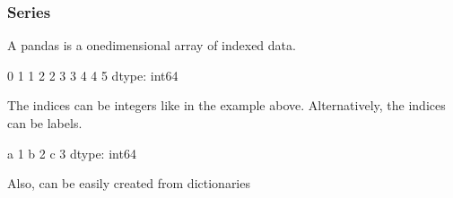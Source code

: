 \documentclass[letterpaper,10pt,english]{sphinxmanual}
\begin{document}
\subsubsection{Series}
\label{\detokenize{content/Introduction_to_Pandas:series}}
A pandas  is a one\sphinxhyphen{}dimensional array of indexed data.

\begin{sphinxVerbatim}[commandchars=\\\{\}]
   

  \PYG{p}{[}    \PYG{p}{]}
\end{sphinxVerbatim}

\begin{sphinxVerbatim}[commandchars=\\\{\}]
0    1
1    2
2    3
3    4
4    5
dtype: int64
\end{sphinxVerbatim}

The indices can be integers like in the example above. Alternatively, the indices can be labels.

\begin{sphinxVerbatim}[commandchars=\\\{\}]
  \PYG{p}{[}\PYG{p}{]} \PYG{p}{[}  \PYG{p}{]}
\end{sphinxVerbatim}

\begin{sphinxVerbatim}[commandchars=\\\{\}]
a    1
b    2
c    3
dtype: int64
\end{sphinxVerbatim}

Also,  can be easily created from dictionaries

\begin{sphinxVerbatim}[commandchars=\\\{\}]
    
\end{sphinxVerbatim}
\end{document}
